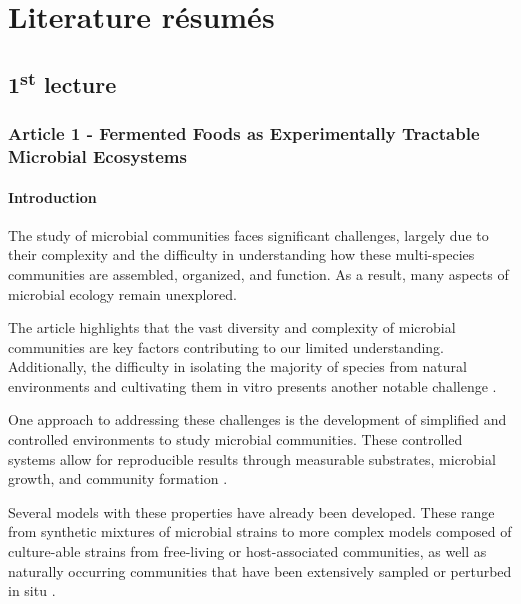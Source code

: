 \chapter{Literature résumés}
\setlength{\headheight}{12.71342pt}
\addtolength{\topmargin}{-0.71342pt}

\section{1\texorpdfstring{\textsuperscript{st}}{st} lecture}
\subsection{Article 1 - Fermented Foods as Experimentally Tractable Microbial Ecosystems}
\subsubsection*{Introduction}
The study of microbial communities faces significant challenges, largely due to their complexity and the difficulty in understanding how these multi-species communities are assembled, organized, and function. As a result, many aspects of microbial ecology remain unexplored.

The article highlights that the vast diversity and complexity of microbial communities are key factors contributing to our limited understanding. Additionally, the difficulty in isolating the majority of species from natural environments and cultivating them in vitro presents another notable challenge \cite*{L1-FermentedFoods}.

One approach to addressing these challenges is the development of simplified and controlled environments to study microbial communities. These controlled systems allow for reproducible results through measurable substrates, microbial growth, and community formation \cite*{L1-FermentedFoods}.

Several models with these properties have already been developed. These range from synthetic mixtures of microbial strains to more complex models composed of culture-able strains from free-living or host-associated communities, as well as naturally occurring communities that have been extensively sampled or perturbed in situ \cite*{L1-FermentedFoods}.

